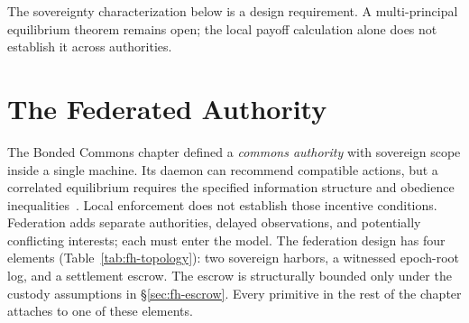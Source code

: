 \documentclass[11pt,a4paper]{article}
\theoremstyle{definition}
\theoremstyle{remark}
\begin{document}
The sovereignty characterization below is a design requirement. A multi-principal
equilibrium theorem remains open; the local payoff calculation alone does not
establish it across authorities.
\section{The Federated Authority}\label{sec:fh-authority}
The Bonded Commons chapter defined a \emph{commons authority} with sovereign scope inside a single machine. Its daemon can recommend compatible actions, but a correlated equilibrium requires the specified information structure and obedience inequalities~. Local enforcement does not establish those incentive conditions. Federation adds separate authorities, delayed observations, and potentially conflicting interests; each must enter the model.
The federation design has four elements (Table~\ref{tab:fh-topology}): two sovereign harbors, a witnessed epoch-root log, and a settlement escrow. The escrow is structurally bounded only under the custody assumptions in \S\ref{sec:fh-escrow}. Every primitive in the rest of the chapter attaches to one of these elements.

\end{document}
